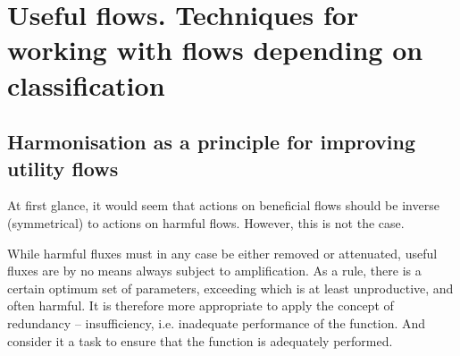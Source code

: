 \documentclass[a4paper,11pt]{article}
\begin{document}
\section{Useful flows. Techniques for working with flows depending on
  classification} 

\subsection{Harmonisation as a principle for improving utility flows}

At first glance, it would seem that actions on beneficial flows should be
inverse (symmetrical) to actions on harmful flows. However, this is not the
case.

While harmful fluxes must in any case be either removed or attenuated, useful
fluxes are by no means always subject to amplification. As a rule, there is a
certain optimum set of parameters, exceeding which is at least unproductive,
and often harmful. It is therefore more appropriate to apply the concept of
redundancy -- insufficiency, i.e. inadequate performance of the function. And
consider it a task to ensure that the function is adequately performed.
\end{document}
